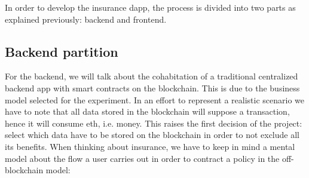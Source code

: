 {In order to develop the insurance dapp, the process is divided into two parts as explained previously: backend and frontend.}

\subsection{Backend partition}
{For the backend, we will talk about the cohabitation of a traditional centralized backend app with smart contracts on the blockchain. This is due to the business model selected for the experiment. In an effort to represent a realistic scenario we have to note that all data stored in the blockchain will suppose a transaction, hence it will consume \acrshort{eth}, i.e. money. This raises the first decision of the project: select which data have to be stored on the blockchain in order to not exclude all its benefits. When thinking about insurance, we have to keep in mind a mental model about the flow a user carries out in order to contract a policy in the off-blockchain model: }
